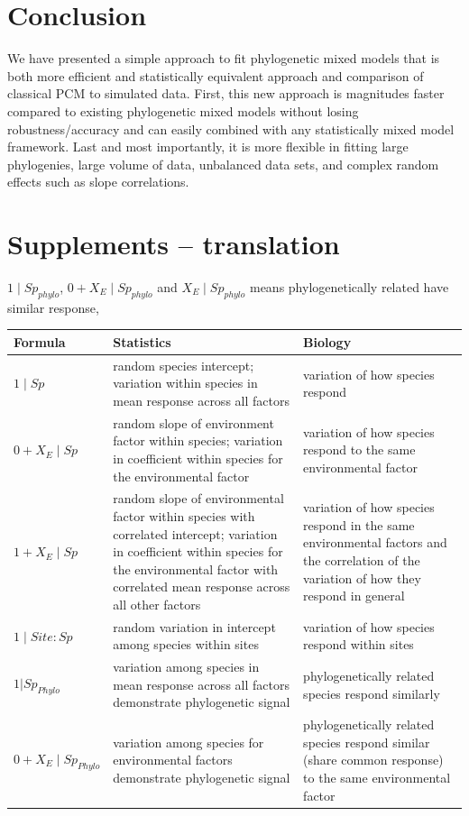 \section{Conclusion}

We have presented a simple approach to fit phylogenetic mixed models that is both more efficient and statistically equivalent approach and comparison of classical PCM to simulated data. 
First, this new approach is magnitudes faster compared to existing phylogenetic mixed models without losing robustness/accuracy and can easily combined with any statistically mixed model framework. 
Last and most importantly, it is more flexible in fitting large phylogenies, large volume of data, unbalanced data sets, and complex random effects such as slope correlations.



\newpage

\section{Supplements -- translation}

$1 \mid Sp_{phylo}$, $0 + X_{E} \mid Sp_{phylo}$ and $X_{E} \mid Sp_{phylo}$ means phylogenetically related have similar response,   

\begin{tabularx}{\textwidth}{|l|X|X|}
\hline
Formula & Statistics & Biology \\
\hline
$1 \mid Sp$ &
random species intercept; variation within species in mean response across all factors &
variation of how species respond \\
\hline

$0 + X_{E} \mid Sp$ &
random slope of environment factor within species; variation in coefficient within species for the environmental factor &
variation of how species respond to the same environmental factor \\
\hline

$1 + X_{E} \mid Sp$ &
random slope of environmental factor within species with correlated intercept; variation in coefficient within species for the environmental factor with correlated mean response across all other factors &
variation of how species respond in the same environmental factors and the correlation of the variation of how they respond in general \\
\hline

$1 \mid Site:Sp $ &
random variation in intercept among species within sites &
variation of how species respond within sites \\
\hline

$1 | Sp_{Phylo} $ &
variation among species in mean response across all factors demonstrate phylogenetic signal &
phylogenetically related species respond similarly \\
\hline

$0 + X_{E} \mid Sp_{Phylo}$ &
variation among species for environmental factors demonstrate phylogenetic signal &
phylogenetically related species respond similar (share common response) to the same environmental factor \\
\hline
\end{tabularx}
            
                                                                        
